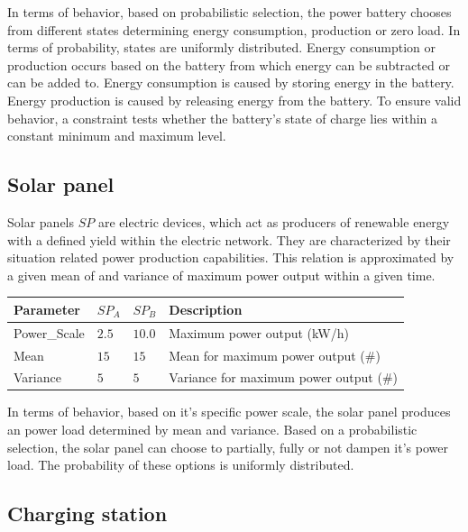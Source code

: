 In terms of behavior, based on probabilistic selection, the power battery chooses from different states determining energy consumption, production or zero load. In terms of probability, states are uniformly distributed. Energy consumption or production occurs based on the battery from which energy can be subtracted or can be added to. Energy consumption is caused by storing energy in the battery. Energy production is caused by releasing energy from the battery. To ensure valid behavior, a constraint tests whether the battery's state of charge lies within a constant minimum and maximum level.

\subsection{Solar panel}

Solar panels $SP$ are electric devices, which act as producers of renewable energy with a defined yield within the electric network. They are characterized by their situation related power production capabilities. This relation is approximated by a given mean of and variance of maximum power output within a given time.

\begin{table}[h]
	\renewcommand{\arraystretch}{1.3}
	\centering
	\begin{tabular}{llll}
		\hline
		\textbf{Parameter}                     & \textbf{$SP_{A}$} & \textbf{$SP_{B}$} & \textbf{Description} \\ \hline
		Power\_Scale                       	   & $2.5$ & $10.0$ & Maximum power output (kW/h) \\
		Mean                       	  		  & $15$ & $15$ & Mean for maximum power output (\#) \\
		Variance                       	       & $5$ & $5$ & Variance for maximum power output (\#) \\ \hline
	\end{tabular}
\end{table}

In terms of behavior, based on it's specific power scale, the solar panel produces an power load determined by mean and variance. Based on a probabilistic selection, the solar panel can choose to partially, fully or not dampen it's power load. The probability of these options is uniformly distributed.

\subsection{Charging station}

